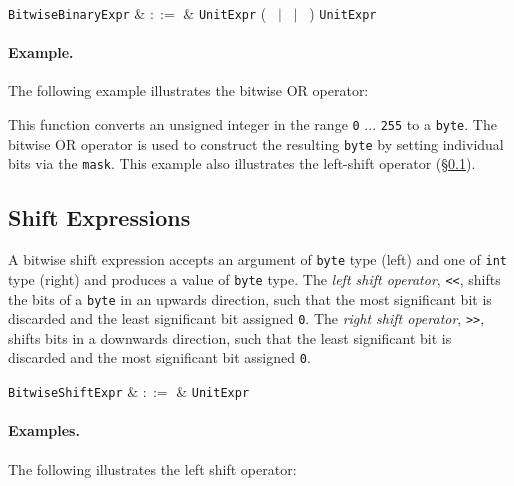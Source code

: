 \begin{syntax}
  \verb+BitwiseBinaryExpr+ & $::=$ & \verb+UnitExpr+ \big(\ \token{\&} $|$ \token{|}\ $|$ \token{\^}\ \big) \verb+UnitExpr+\\
\end{syntax}

\paragraph{Example.}  The following example illustrates the bitwise OR operator:



This function converts an unsigned integer in the range \lstinline{0} ... \lstinline{255} to a \lstinline{byte}.  The bitwise OR operator is used to construct the resulting \lstinline{byte} by setting individual bits via the \lstinline{mask}.  This example also illustrates the left-shift operator (\S\ref{c_expr_shift}).


\subsection{Shift Expressions}
\label{c_expr_shift}

A bitwise shift expression accepts an argument of \lstinline{byte} type (left) and one of \lstinline{int} type (right) and produces a value of \lstinline{byte} type.  The {\em left shift operator}, \lstinline{<<}, shifts the bits of a \lstinline{byte} in an upwards direction, such that the most significant bit is discarded and the least significant bit assigned \lstinline{0}.  The {\em right shift operator}, \lstinline{>>}, shifts bits in a downwards direction, such that the least significant bit is discarded and the most significant bit assigned \lstinline{0}.  

\begin{syntax}
  \verb+BitwiseShiftExpr+ & $::=$ & \verb+UnitExpr+\ 
\end{syntax}

\paragraph{Examples.} The following illustrates the left shift operator:

